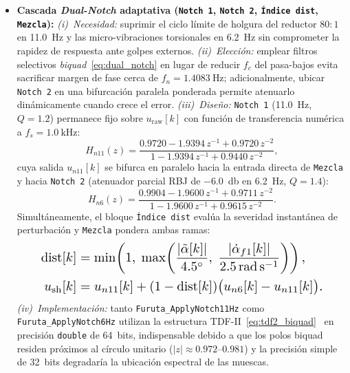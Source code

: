 \begin{itemize}
    \item \textbf{Cascada \textit{Dual-Notch} adaptativa (\texttt{Notch 1}, \texttt{Notch 2}, \texttt{Índice dist}, \texttt{Mezcla}):}
    \textit{(i)~Necesidad:} suprimir el ciclo límite de holgura del reductor $80:1$ en \qty{11.0}{\hertz} y las micro-vibraciones torsionales en \qty{6.2}{\hertz} sin comprometer la rapidez de respuesta ante golpes externos.
    \textit{(ii)~Elección:} emplear filtros selectivos \textit{biquad}~\eqref{eq:dual_notch} en lugar de reducir $f_c$ del pasa-bajos evita sacrificar margen de fase cerca de $f_n=\qty{1.4083}{\hertz}$; adicionalmente, ubicar \texttt{Notch 2} en una bifurcación paralela ponderada permite atenuarlo dinámicamente cuando crece el error.
    \textit{(iii)~Diseño:} \texttt{Notch 1} (\qty{11.0}{\hertz}, $Q=1.2$) permanece fijo sobre $u_{\text{raw}}[k]$ con función de transferencia numérica a $f_s=\qty{1.0}{\kilo\hertz}$:
    \begin{equation}
        H_{n11}(z) = \frac{0.9720 - 1.9394\,z^{-1} + 0.9720\,z^{-2}}{1 - 1.9394\,z^{-1} + 0.9440\,z^{-2}},
        \label{eq:hz_n11}
    \end{equation}
    cuya salida $u_{n11}[k]$ se bifurca en paralelo hacia la entrada directa de \texttt{Mezcla} y hacia \texttt{Notch 2} (atenuador parcial RBJ de \qty{-6.0}{\decibel} en \qty{6.2}{\hertz}, $Q=1.4$):
    \begin{equation}
        H_{n6}(z) = \frac{0.9904 - 1.9600\,z^{-1} + 0.9711\,z^{-2}}{1 - 1.9600\,z^{-1} + 0.9615\,z^{-2}}.
        \label{eq:hz_n6}
    \end{equation}
    Simultáneamente, el bloque \texttt{Índice dist} evalúa la severidad instantánea de perturbación y \texttt{Mezcla} pondera ambas ramas:
    \begin{equation}
    \resizebox{0.85\linewidth}{!}{$\displaystyle
        \begin{aligned}
            \mathrm{dist}[k] &= \min\!\left(1,\; \max\!\left(\frac{|\tilde{\alpha}[k]|}{\qty{4.5}{\degree}},\; \frac{|\dot{\alpha}_{f1}[k]|}{\qty{2.5}{\radian\per\second}}\right)\right), \\
            u_{\text{sh}}[k] &= u_{n11}[k] + (1 - \mathrm{dist}[k])\bigl(u_{n6}[k] - u_{n11}[k]\bigr).
        \end{aligned}
    $}
        \label{eq:mezcla_dist}
    \end{equation}
    \mbox{\textit{(iv)~Implementación:}} tanto \texttt{Furuta\_\allowbreak ApplyNotch11Hz} como \texttt{Furuta\_\allowbreak ApplyNotch6Hz} utilizan la estructura TDF-II~\eqref{eq:tdf2_biquad}~\cite{Oppenheim2010} en precisión \texttt{double} de 64~bits, indispensable debido a que los polos biquad residen próximos al círculo unitario ($|z|\approx 0.972\text{--}0.981$) y la precisión simple de 32~bits degradaría la ubicación espectral de las muescas.


\end{itemize}
